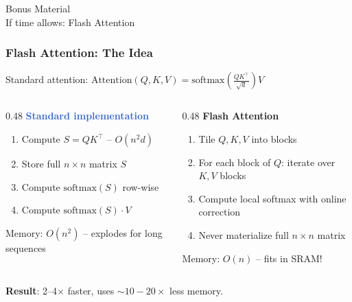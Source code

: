\documentclass[aspectratio=169]{beamer}
\begin{document}
\begin{frame}
	\begin{center}
		\vspace{2em}
		{\Large\textcolor{codegreen}{Bonus Material}} \\[1em]
		{\large If time allows: Flash Attention}
	\end{center}
\end{frame}

\begin{frame}
	\frametitle{Flash Attention: The Idea}
	Standard attention: $\text{Attention}(Q, K, V) = \text{softmax}\!\left(\frac{QK^\top}{\sqrt{d}}\right)V$
	\vspace{0.5em}
	\begin{columns}
		\begin{column}{0.48\textwidth}
			\textbf{\textcolor{highlight}{Standard implementation}}
			\begin{enumerate}
				\item Compute $S = QK^\top$ -- $O(n^2 d)$
				\item Store full $n \times n$ matrix $S$
				\item Compute $\text{softmax}(S)$ row-wise
				\item Compute $\text{softmax}(S) \cdot V$
			\end{enumerate}
			Memory: $O(n^2)$ -- explodes for long sequences
		\end{column}
		\begin{column}{0.48\textwidth}
			\textbf{\textcolor{codegreen}{Flash Attention}}
			\begin{enumerate}
				\item Tile $Q, K, V$ into blocks
				\item For each block of $Q$: iterate over $K, V$ blocks
				\item Compute local softmax with online correction
				\item Never materialize full $n \times n$ matrix
			\end{enumerate}
			Memory: $O(n)$ -- fits in SRAM!
		\end{column}
	\end{columns}
	\vspace{0.5em}
	\textbf{Result}: 2--4$\times$ faster, uses $\sim$$10{-}20\times$ less memory.
\end{frame}
\end{document}
